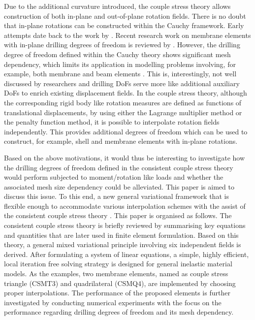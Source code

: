 \documentclass[3p,sort&compress,11pt,fleqn,review]{elsarticle}
\begin{document}
Due to the additional curvature introduced, the couple stress theory allows construction of both in-plane and out-of-plane rotation fields. There is no doubt that in-plane rotations can be constructed within the Cauchy framework. Early attempts date back to the work by \citet{Allman1984}. Recent research work on membrane elements with in-plane drilling degrees of freedom is reviewed by \citet{Boutagouga2020}. However, the drilling degree of freedom defined within the Cauchy theory shows significant mesh dependency, which limits its application in modelling problems involving, for example, both membrane and beam elements \citep{Chang2020}. This is, interestingly, not well discussed by researchers and drilling DoFs serve more like additional auxiliary DoFs to enrich existing displacement fields. In the couple stress theory, although the corresponding rigid body like rotation measures are defined as functions of translational displacements, by using either the Lagrange multiplier method or the penalty function method, it is possible to interpolate rotation fields independently. This provides additional degrees of freedom which can be used to construct, for example, shell and membrane elements with in-plane rotations.

\alert{Based on the above motivations, it would thus be interesting to investigate how the drilling degrees of freedom defined in the consistent couple stress theory would perform subjected to moment/rotation like loads and whether the associated mesh size dependency could be alleviated. This paper is aimed to discuss this issue. To this end, a new general variational framework that is flexible enough to accommodate various interpolation schemes with the assist of the consistent couple stress theory \citep{Hadjesfandiari2011}.} This paper is organised as follows. The consistent couple stress theory is briefly reviewed by summarising key equations and quantities that are later used in finite element formulation. Based on this theory, a general mixed variational principle involving six independent fields is derived. After formulating a system of linear equations, a simple, highly efficient, local iteration free solving strategy is designed for general inelastic material models. As the examples, two membrane elements, named as couple stress triangle (CSMT3) and quadrilateral (CSMQ4), are implemented by choosing proper interpolations. The performance of the proposed elements is further investigated by conducting numerical experiments with the focus on the performance regarding drilling degrees of freedom and its mesh dependency.
\end{document}
